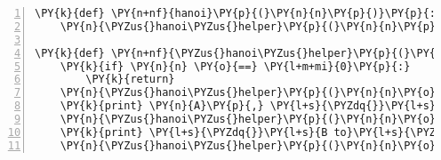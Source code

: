 \begin{Verbatim}[commandchars=\\\{\},numbers=left,firstnumber=1,stepnumber=1,codes={\catcode`\$=3\catcode`\^=7\catcode`\_=8}]
\PY{k}{def} \PY{n+nf}{hanoi}\PY{p}{(}\PY{n}{n}\PY{p}{)}\PY{p}{:}
    \PY{n}{\PYZus{}hanoi\PYZus{}helper}\PY{p}{(}\PY{n}{n}\PY{p}{,} \PY{l+s}{\PYZsq{}}\PY{l+s}{A}\PY{l+s}{\PYZsq{}}\PY{p}{,} \PY{l+s}{\PYZsq{}}\PY{l+s}{C}\PY{l+s}{\PYZsq{}}\PY{p}{)}

\PY{k}{def} \PY{n+nf}{\PYZus{}hanoi\PYZus{}helper}\PY{p}{(}\PY{n}{n}\PY{p}{,} \PY{n}{A}\PY{p}{,} \PY{n}{C}\PY{p}{)}\PY{p}{:}
    \PY{k}{if} \PY{n}{n} \PY{o}{==} \PY{l+m+mi}{0}\PY{p}{:}
        \PY{k}{return}
    \PY{n}{\PYZus{}hanoi\PYZus{}helper}\PY{p}{(}\PY{n}{n}\PY{o}{\PYZhy{}}\PY{l+m+mi}{1}\PY{p}{,} \PY{n}{A}\PY{p}{,} \PY{n}{C}\PY{p}{)}
    \PY{k}{print} \PY{n}{A}\PY{p}{,} \PY{l+s}{\PYZdq{}}\PY{l+s}{to B}\PY{l+s}{\PYZdq{}}
    \PY{n}{\PYZus{}hanoi\PYZus{}helper}\PY{p}{(}\PY{n}{n}\PY{o}{\PYZhy{}}\PY{l+m+mi}{1}\PY{p}{,} \PY{n}{C}\PY{p}{,} \PY{n}{A}\PY{p}{)}
    \PY{k}{print} \PY{l+s}{\PYZdq{}}\PY{l+s}{B to}\PY{l+s}{\PYZdq{}}\PY{p}{,} \PY{n}{C}
    \PY{n}{\PYZus{}hanoi\PYZus{}helper}\PY{p}{(}\PY{n}{n}\PY{o}{\PYZhy{}}\PY{l+m+mi}{1}\PY{p}{,} \PY{n}{A}\PY{p}{,} \PY{n}{C}\PY{p}{)}
\end{Verbatim}
